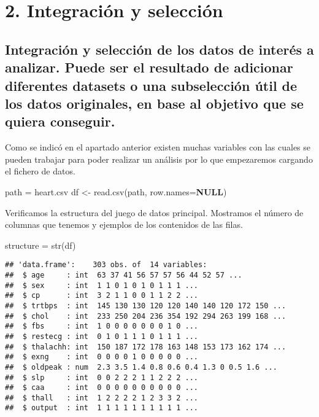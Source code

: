 \documentclass[
]{article}
\newenvironment{Shaded}{\begin{snugshade}}{\end{snugshade}}
\newcommand{\AttributeTok}[1]{\textcolor[rgb]{0.80,0.80,0.80}{#1}}
\newcommand{\ConstantTok}[1]{\textcolor[rgb]{0.86,0.64,0.64}{\textbf{#1}}}
\newcommand{\FunctionTok}[1]{\textcolor[rgb]{0.94,0.94,0.56}{#1}}
\newcommand{\NormalTok}[1]{\textcolor[rgb]{0.80,0.80,0.80}{#1}}
\newcommand{\OtherTok}[1]{\textcolor[rgb]{0.94,0.94,0.56}{#1}}
\newcommand{\StringTok}[1]{\textcolor[rgb]{0.80,0.58,0.58}{#1}}
\begin{document}
\hypertarget{integraciuxf3n-y-selecciuxf3n}{%
\section{2. Integración y
selección}\label{integraciuxf3n-y-selecciuxf3n}}

\hypertarget{integraciuxf3n-y-selecciuxf3n-de-los-datos-de-interuxe9s-a-analizar.-puede-ser-el-resultado-de-adicionar-diferentes-datasets-o-una-subselecciuxf3n-uxfatil-de-los-datos-originales-en-base-al-objetivo-que-se-quiera-conseguir.}{%
\subsection{Integración y selección de los datos de interés a analizar.
Puede ser el resultado de adicionar diferentes datasets o una
subselección útil de los datos originales, en base al objetivo que se
quiera
conseguir.}\label{integraciuxf3n-y-selecciuxf3n-de-los-datos-de-interuxe9s-a-analizar.-puede-ser-el-resultado-de-adicionar-diferentes-datasets-o-una-subselecciuxf3n-uxfatil-de-los-datos-originales-en-base-al-objetivo-que-se-quiera-conseguir.}}

Como se indicó en el apartado anterior existen muchas variables con las
cuales se pueden trabajar para poder realizar un análisis por lo que
empezaremos cargando el fichero de datos.

\begin{Shaded}
\begin{Highlighting}[]
\NormalTok{path }\OtherTok{=} \StringTok{\textquotesingle{}heart.csv\textquotesingle{}}
\NormalTok{df }\OtherTok{\textless{}{-}} \FunctionTok{read.csv}\NormalTok{(path, }\AttributeTok{row.names=}\ConstantTok{NULL}\NormalTok{)}
\end{Highlighting}
\end{Shaded}

Verificamos la estructura del juego de datos principal. Mostramos el
número de columnas que tenemos y ejemplos de los contenidos de las
filas.

\begin{Shaded}
\begin{Highlighting}[]
\NormalTok{structure }\OtherTok{=} \FunctionTok{str}\NormalTok{(df)}
\end{Highlighting}
\end{Shaded}

\begin{verbatim}
## 'data.frame':    303 obs. of  14 variables:
##  $ age     : int  63 37 41 56 57 57 56 44 52 57 ...
##  $ sex     : int  1 1 0 1 0 1 0 1 1 1 ...
##  $ cp      : int  3 2 1 1 0 0 1 1 2 2 ...
##  $ trtbps  : int  145 130 130 120 120 140 140 120 172 150 ...
##  $ chol    : int  233 250 204 236 354 192 294 263 199 168 ...
##  $ fbs     : int  1 0 0 0 0 0 0 0 1 0 ...
##  $ restecg : int  0 1 0 1 1 1 0 1 1 1 ...
##  $ thalachh: int  150 187 172 178 163 148 153 173 162 174 ...
##  $ exng    : int  0 0 0 0 1 0 0 0 0 0 ...
##  $ oldpeak : num  2.3 3.5 1.4 0.8 0.6 0.4 1.3 0 0.5 1.6 ...
##  $ slp     : int  0 0 2 2 2 1 1 2 2 2 ...
##  $ caa     : int  0 0 0 0 0 0 0 0 0 0 ...
##  $ thall   : int  1 2 2 2 2 1 2 3 3 2 ...
##  $ output  : int  1 1 1 1 1 1 1 1 1 1 ...
\end{verbatim}
\end{document}
